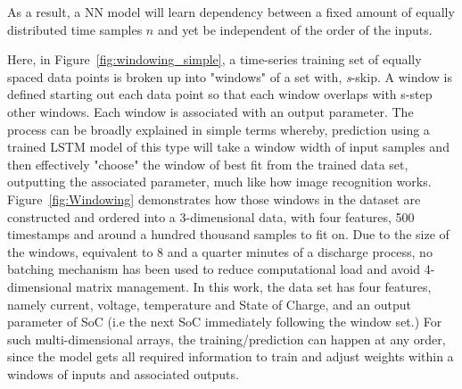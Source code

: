 As a result, a NN model will learn dependency between a fixed amount of equally distributed time samples $n$ and yet be independent of the order of the inputs.

%
%
Here, in Figure~\ref{fig:windowing_simple}, a time-series training set of equally spaced data points is broken up into "windows" of a set with, \textit{s}-skip.
A window is defined starting out each data point so that each window overlaps with s-step other windows.
Each window is associated with an output parameter.
The process can be broadly explained in simple terms whereby, prediction using a trained LSTM model of this type will take a window width of input samples and then effectively "choose" the window of best fit from the trained data set, outputting the associated parameter, much like how image recognition works.
\mbox{Figure~\ref{fig:Windowing}} demonstrates how those windows in the dataset are constructed and ordered into a 3-dimensional data, with four features, 500 timestamps and around a hundred thousand samples to fit on.
Due to the size of the windows, equivalent to 8 and a quarter minutes of a discharge process, no batching mechanism has been used to reduce computational load and avoid 4-dimensional matrix management.
In this work, the data set has four features, namely current, voltage, temperature and State of Charge, and an output parameter of SoC (i.e the next SoC immediately following the window set.)
For such multi-dimensional arrays, the training/prediction can happen at any order, since the model gets all required information to train and adjust weights within a windows of inputs and associated outputs.

